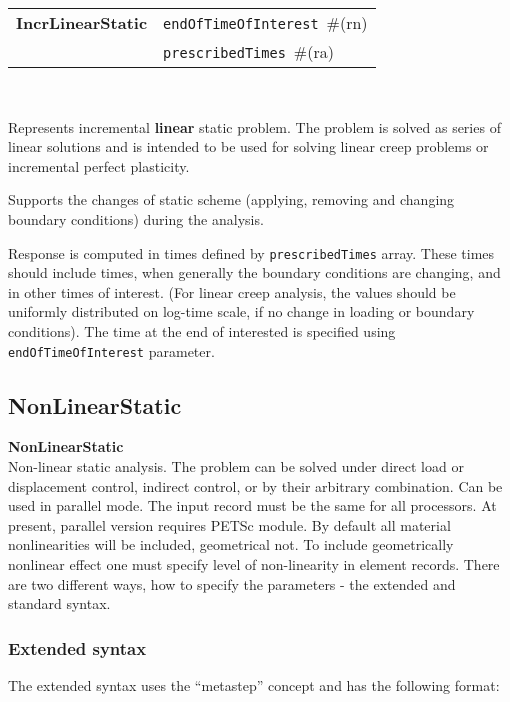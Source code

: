 \documentclass[a4paper]{report}
\newcommand{\param}[1]{\texttt{#1}} %
\newcommand{\field}[2]{\param{#1}~\#{\tiny(#2)}} %
\newcommand{\entKeywordInst}[1]{\textbf{#1}} %
\newcommand{\Pmode}[1]{{\sffamily #1}}
\newenvironment{record}[1][]{\begin{tabular}{|ll}}{\end{tabular}\\}
\newcommand{\recentry}[2]{{#1}&{#2}\\}
\newcounter{rcc}
\newenvironment{record}[1][\textwidth]{\setcounter{rcc}{0}\rowcolors{1}{lightgray}{lightgray}\tabularx{#1}{llR} \hline}
               {\endtabularx}
\newcommand{\recentry}[2]{\ifthenelse{\value{rcc}>0}{$\backslash$ \\}{\setcounter{rcc}{1}}{#1}&{#2}&}
\begin{document}
\begin{record}
  \recentry{\entKeywordInst{IncrLinearStatic}}{\field{endOfTimeOfInterest}{rn}}
  \recentry{}{\field{pre\-scri\-bed\-Ti\-mes}{ra}}
\end{record}


Represents incremental \textbf{linear} static problem.
The problem is solved as series of linear solutions and is intended to
be used for solving linear creep problems or incremental perfect plasticity.

Supports the changes of static scheme (applying, removing and changing  boundary conditions)
during the analysis.

Response is computed in times defined by \param{pre\-scri\-bed\-Ti\-mes}
array. These times should include times, when generally the  boundary
conditions are changing, and in other times of interest. (For linear creep
analysis, the values should be uniformly distributed on log-time scale, if no change in
loading or boundary conditions). The time at the end of interested is
specified using \param{endOfTimeOfInterest} parameter.

\subsection{NonLinearStatic}
\label{NonLinearStatic}
\entKeywordInst{NonLinearStatic} \\
Non-linear static analysis. The problem can be solved under
direct load or displacement control, indirect control, or by
their arbitrary combination.
\Pmode{Can be used in parallel mode. The input record must be the same
for all processors. At present, parallel version requires PETSc module.}
By default all
material nonlinearities will be included, geometrical not.
To include geometrically nonlinear effect one must specify
level of non-linearity in element records.
There are two different ways, how to specify the parameters - the
extended and standard syntax.
\subsubsection{Extended syntax}
The extended syntax uses the ``metastep'' concept and has the
following format:
\end{document}
